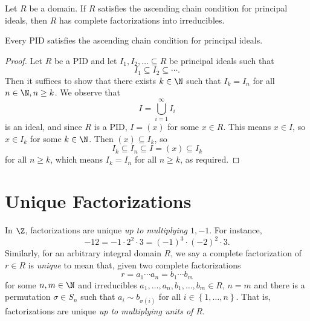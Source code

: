 \documentclass[pmath347]{subfiles}
\begin{document}
    \begin{prop}{}
        Let $R$ be a domain. If $R$ satisfies the ascending chain condition for principal ideals, then $R$ has complete factorizations into irreducibles.
    \end{prop}

    \begin{prop}{}
        Every PID satisfies the ascending chain condition for principal ideals.
    \end{prop}

    \begin{proof}
        Let $R$ be a PID and let $I_1,I_2,\ldots\subseteq R$ be principal ideals such that
        \begin{equation*}
            I_1\subseteq I_2\subseteq\cdots.
        \end{equation*}
        Then it suffices to show that there exists $k\in\N$ such that $I_k = I_n$ for all $n\in\N, n\geq k$. We observe that
        \begin{equation*}
            I = \bigcup^{\infty}_{i=1} I_i
        \end{equation*}
        is an ideal, and since $R$ is a PID, $I=\left( x \right)$ for some $x\in R$. This means $x\in I$, so $x\in I_k$ for some $k\in\N$. Then $\left( x \right) \subseteq I_k$, so
        \begin{equation*}
            I_k \subseteq I_n \subseteq I = \left( x \right) \subseteq I_k
        \end{equation*}
        for all $n\geq k$, which means $I_k=I_n$ for all $n\geq k$, as required.
    \end{proof}

    \section{Unique Factorizations}

    In $\Z$, factorizations are unique \textit{up to multiplying $1,-1$}. For instance,
    \begin{equation*}
        -12 = -1\cdot2^2\cdot3 = \left( -1 \right) ^3\cdot\left( -2 \right) ^2\cdot 3.
    \end{equation*}
    Similarly, for an arbitrary integral domain $R$, we say a complete factorization of $r\in R$ is \textit{unique} to mean that, given two complete factorizations
    \begin{equation*}
        r = a_1\cdots a_n = b_1\cdots b_m
    \end{equation*}
    for some $n,m\in\N$ and irreducibles $a_1,\ldots,a_n,b_1,\ldots,b_m\in R$, $n=m$ and there is a permutation $\sigma\in S_n$ such that $a_i\sim b_{\sigma\left( i \right) }$ for all $i\in\left\lbrace 1,\ldots,n \right\rbrace$. That is, factorizations are unique \textit{up to multiplying units of $R$}.
\end{document}
